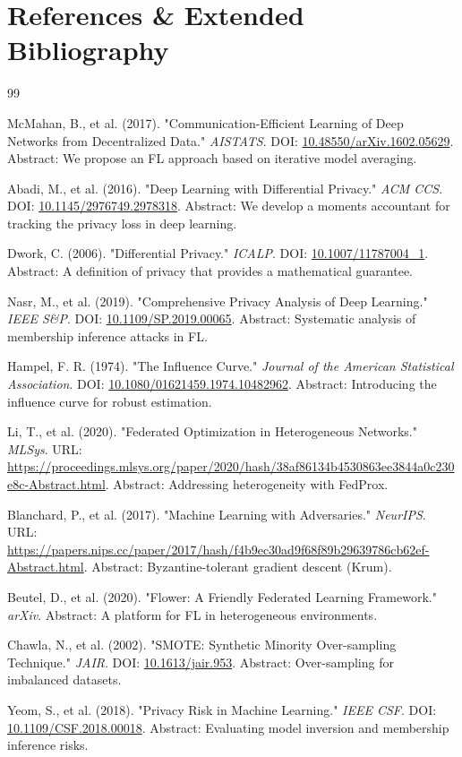 \documentclass[10pt, a4paper, twocolumn]{article}
\begin{document}
\section{References \& Extended Bibliography}
\begin{thebibliography}{99}

 McMahan, B., et al. (2017). "Communication-Efficient Learning of Deep Networks from Decentralized Data." \textit{AISTATS}. DOI: \url{10.48550/arXiv.1602.05629}. Abstract: We propose an FL approach based on iterative model averaging.

 Abadi, M., et al. (2016). "Deep Learning with Differential Privacy." \textit{ACM CCS}. DOI: \url{10.1145/2976749.2978318}. Abstract: We develop a moments accountant for tracking the privacy loss in deep learning.

 Dwork, C. (2006). "Differential Privacy." \textit{ICALP}. DOI: \url{10.1007/11787004_1}. Abstract: A definition of privacy that provides a mathematical guarantee.

 Nasr, M., et al. (2019). "Comprehensive Privacy Analysis of Deep Learning." \textit{IEEE S\&P}. DOI: \url{10.1109/SP.2019.00065}. Abstract: Systematic analysis of membership inference attacks in FL.

 Hampel, F. R. (1974). "The Influence Curve." \textit{Journal of the American Statistical Association}. DOI: \url{10.1080/01621459.1974.10482962}. Abstract: Introducing the influence curve for robust estimation.

 Li, T., et al. (2020). "Federated Optimization in Heterogeneous Networks." \textit{MLSys}. URL: \url{https://proceedings.mlsys.org/paper/2020/hash/38af86134b4530863ee3844a0c230e8c-Abstract.html}. Abstract: Addressing heterogeneity with FedProx.

 Blanchard, P., et al. (2017). "Machine Learning with Adversaries." \textit{NeurIPS}. URL: \url{https://papers.nips.cc/paper/2017/hash/f4b9ec30ad9f68f89b29639786cb62ef-Abstract.html}. Abstract: Byzantine-tolerant gradient descent (Krum).

 Beutel, D., et al. (2020). "Flower: A Friendly Federated Learning Framework." \textit{arXiv}. Abstract: A platform for FL in heterogeneous environments.

 Chawla, N., et al. (2002). "SMOTE: Synthetic Minority Over-sampling Technique." \textit{JAIR}. DOI: \url{10.1613/jair.953}. Abstract: Over-sampling for imbalanced datasets.

 Yeom, S., et al. (2018). "Privacy Risk in Machine Learning." \textit{IEEE CSF}. DOI: \url{10.1109/CSF.2018.00018}. Abstract: Evaluating model inversion and membership inference risks.

\end{thebibliography}
\end{document}
